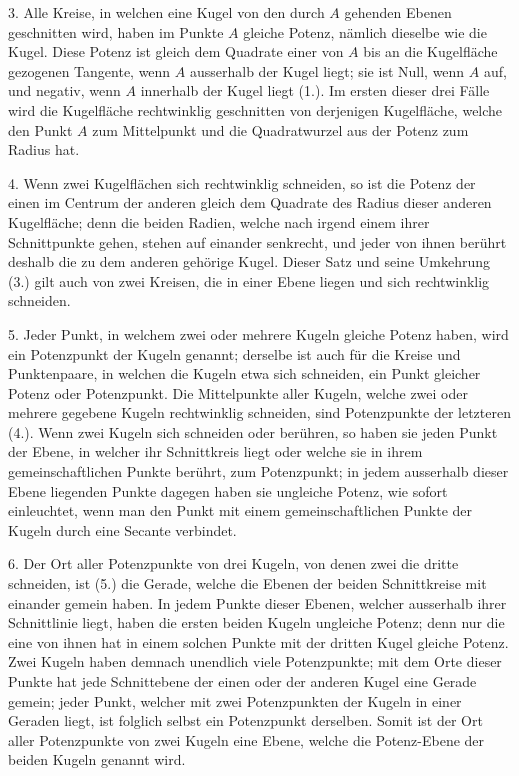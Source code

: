 
3. Alle Kreise, in welchen eine Kugel von den durch
$A$ gehenden Ebenen geschnitten wird, haben im Punkte $A$
gleiche Potenz, n\"amlich dieselbe wie die Kugel. Diese Potenz
ist gleich dem Quadrate einer von $A$ bis an die Kugelfl\"ache
gezogenen Tangente, wenn $A$ ausserhalb der Kugel
liegt; sie ist Null, wenn $A$ auf, und negativ, wenn $A$ innerhalb
der Kugel liegt (1.). Im ersten dieser drei F\"alle wird
die Kugelfl\"ache rechtwinklig geschnitten von derjenigen Kugelfl\"ache,
welche den Punkt $A$ zum Mittelpunkt und die
Quadratwurzel aus der Potenz zum Radius hat.

4. Wenn zwei Kugelfl\"achen sich rechtwinklig schneiden,
so ist die Potenz der einen im Centrum der anderen gleich
dem Quadrate des Radius dieser anderen Kugelfl\"ache; denn
die beiden Radien, welche nach irgend einem ihrer Schnittpunkte
gehen, stehen auf einander senkrecht, und jeder von
ihnen ber\"uhrt deshalb die zu dem anderen geh\"orige Kugel.
Dieser Satz und seine Umkehrung (3.) gilt auch von zwei
Kreisen, die in einer Ebene liegen und sich rechtwinklig
schneiden.

5. Jeder Punkt, in welchem zwei oder mehrere Kugeln
gleiche Potenz haben, wird ein {\glqq}Potenzpunkt{\grqq} der Kugeln
genannt; derselbe ist auch f\"ur die Kreise und Punktenpaare,
in welchen die Kugeln etwa sich schneiden, ein Punkt gleicher
Potenz oder {\glqq}Potenzpunkt{\grqq}. Die Mittelpunkte aller
Kugeln, welche zwei oder mehrere gegebene Kugeln rechtwinklig
schneiden, sind Potenzpunkte der letzteren (4.). Wenn
zwei Kugeln sich schneiden oder ber\"uhren, so haben sie
jeden Punkt der Ebene, in welcher ihr Schnittkreis liegt
oder welche sie in ihrem gemeinschaftlichen Punkte ber\"uhrt,
zum Potenzpunkt; in jedem ausserhalb dieser Ebene liegenden
Punkte dagegen haben sie ungleiche Potenz, wie sofort
einleuchtet, wenn man den Punkt mit einem gemeinschaftlichen
Punkte der Kugeln durch eine Secante verbindet.

6. Der Ort aller Potenzpunkte von drei Kugeln, von
denen zwei die dritte schneiden, ist (5.) die Gerade, welche
die Ebenen der beiden Schnittkreise mit einander gemein
haben. In jedem Punkte dieser Ebenen, welcher ausser\-halb
ihrer Schnittlinie liegt, haben die ersten beiden Kugeln
ungleiche Potenz; denn nur die eine von ihnen hat in einem
solchen Punkte mit der dritten Kugel gleiche Potenz. Zwei
Kugeln haben demnach unendlich viele Potenzpunkte; mit
dem Orte dieser Punkte hat jede Schnittebene der einen oder
der anderen Kugel eine Gerade gemein; jeder Punkt, welcher
mit zwei Potenzpunkten der Kugeln in einer Geraden liegt,
ist folglich selbst ein Potenzpunkt derselben. Somit ist der
Ort aller Potenzpunkte von zwei Kugeln eine Ebene, welche
die {\glqq}Potenz-Ebene{\grqq} der beiden Kugeln genannt wird.

